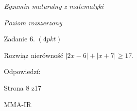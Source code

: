 \documentclass[a4paper,12pt]{article}
\begin{document}
{\it Egzamin maturalny z matematyki}

{\it Poziom rozszerzony}

Zadanie 6. $(4pkt)$

Rozwiąz nierówność $|2x-6|+|x+7|\geq 17.$

Odpowiedzí:

Strona 8 z17

MMA-IR
\end{document}
